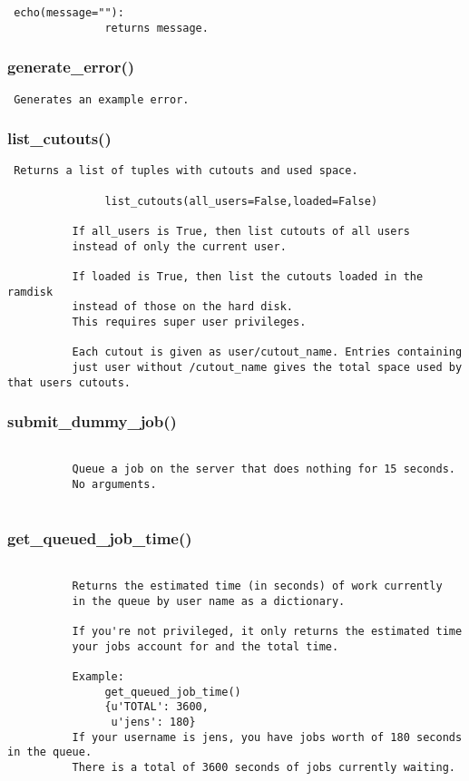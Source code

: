 \begin{verbatim}
 echo(message=""):
               returns message. 
\end{verbatim}
\subsubsection{generate\_error()}


\begin{verbatim}
 Generates an example error. 
\end{verbatim}
\subsubsection{list\_cutouts()}


\begin{verbatim}
 Returns a list of tuples with cutouts and used space.
          
               list_cutouts(all_users=False,loaded=False)

          If all_users is True, then list cutouts of all users
          instead of only the current user.

          If loaded is True, then list the cutouts loaded in the ramdisk
          instead of those on the hard disk.
          This requires super user privileges.

          Each cutout is given as user/cutout_name. Entries containing
          just user without /cutout_name gives the total space used by that users cutouts. 
\end{verbatim}

\subsubsection{submit\_dummy\_job()}


\begin{verbatim}
 
          Queue a job on the server that does nothing for 15 seconds.
          No arguments.
          
\end{verbatim}
\subsubsection{get\_queued\_job\_time()}


\begin{verbatim}

          Returns the estimated time (in seconds) of work currently
          in the queue by user name as a dictionary. 

          If you're not privileged, it only returns the estimated time
          your jobs account for and the total time. 
          
          Example:
               get_queued_job_time()
               {u'TOTAL': 3600,
                u'jens': 180}
          If your username is jens, you have jobs worth of 180 seconds in the queue.
          There is a total of 3600 seconds of jobs currently waiting.
          
          
\end{verbatim}
